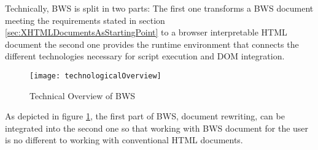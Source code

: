Technically, BWS is split in two parts: The first one transforms a BWS document meeting the requirements stated in section \ref{sec:XHTMLDocumentsAsStartingPoint} to a browser interpretable HTML document the second one provides the runtime environment that connects the different technologies necessary for script execution and DOM integration.

\begin{figure}[htbp]
	\centering
		\texttt{[image: technologicalOverview]}
	\label{fig:TechnicalOverviewOfBWS}
	\caption{Technical Overview of BWS}
\end{figure}

As depicted in figure \ref{fig:TechnicalOverviewOfBWS}, the first part of BWS, document rewriting, can be integrated into the second one so that working with BWS document for the user is no different to working with conventional HTML documents.